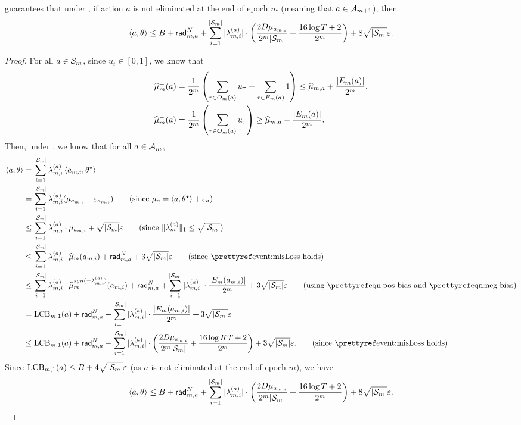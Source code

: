 \begin{lemma}\label{lem:epoch_B_with_mis}
     guarantees that under , if action $a$ is not eliminated at the end of epoch $m$ (meaning that $a\in {\mathcal{A}}_{m+1}$), then
    \begin{align*}
    \left\langle {a,\theta} \right\rangle\leq B +\mathsf{rad}_{m,a}^{N}+ \sum_{i=1}^{|{\mathcal{S}}_m|}|\lambda_{m,i}^{(a)}|\cdot\left(\frac{2D\mu_{a_{m,i}}}{2^m|{\mathcal{S}}_m|}+\frac{16\log T +2}{2^m}\right) + 8\sqrt{|{\mathcal{S}}_m|}\varepsilon.
\end{align*}
\end{lemma}
\begin{proof}
For all $a\in {\mathcal{S}}_m$, since $u_{t}\in[0,1]$, we know that
\begin{align}
    \widehat{\mu}_{m}^+(a) &=\frac{1}{2^m}\left(\sum_{\tau\in O_m(a)}u_{\tau} + \sum_{\tau\in E_m(a)}1\right) \leq \widehat{\mu}_{m,a} + \frac{|E_m(a)|}{2^m}, \label{eqn:pos-bias}\\
    \widehat{\mu}_{m}^-(a) &=\frac{1}{2^m}\left(\sum_{\tau\in O_m(a)}u_{\tau} \right) \geq \widehat{\mu}_{m,a} - \frac{|E_m(a)|}{2^m} \label{eqn:neg-bias}.
\end{align}
Then, under , we know that for all $a\in {\mathcal{A}}_m$,
\begin{align*}
    \inner{a,\theta} &= \sum_{i=1}^{|\calS_m|}\lambda_{m,i}^{(a)}\inner{a_{m,i},\theta^\star}\\
    &= \sum_{i=1}^{|\calS_m|}\lambda_{m,i}^{(a)}(\mu_{a_{m,i}}-\epsilon_{a_{m,i}}) \tag{since $\mu_a = \inner{a,\theta^\star}+\epsilon_a$}\\
    &\leq \sum_{i=1}^{|\calS_m|}\lambda_{m,i}^{(a)}\cdot \mu_{a_{m,i}} + \sqrt{|\calS_m|}\epsilon \tag{since $\|\lambda_{m}^{(a)}\|_1\leq \sqrt{|\calS_m|}$} \\
    &\leq \sum_{i=1}^{|\calS_m|}\lambda_{m,i}^{(a)}\cdot \hat{\mu}_{m}(a_{m,i}) + \rad_{m,a}^{N} + 3\sqrt{|\calS_m|}\epsilon \tag{since \pref{event:misLoss} holds}\\
    &\leq \sum_{i=1}^{|\calS_m|}\lambda_{m,i}^{(a)}\cdot\hat{\mu}_{m}^{sgn(-\lambda_{m,i}^{(a)})}(a_{m,i}) + \rad_{m,a}^{N}+\sum_{i=1}^{|\calS_m|}|\lambda_{m,i}^{(a)}|\cdot \frac{|\unobs_m(a_{m,i})|}{2^m} + 3\sqrt{|\calS_m|}\epsilon \tag{using \pref{eqn:pos-bias} and \pref{eqn:neg-bias}}\\
    &= \LCB_{m,1}(a) + \rad_{m,a}^{N}+\sum_{i=1}^{|\calS_m|}|\lambda_{m,i}^{(a)}|\cdot \frac{|\unobs_m(a_{m,i})|}{2^m} + 3\sqrt{|\calS_m|}\epsilon\\
    &\leq \LCB_{m,1}(a) +\rad_{m,a}^{N}+ \sum_{i=1}^{|\calS_m|}|\lambda_{m,i}^{(a)}|\cdot\left(\frac{2D\mu_{a_{m,i}}}{2^m|\calS_m|}+\frac{16\log KT +2}{2^m}\right) + 3\sqrt{|\calS_m|}\epsilon. \tag{since \pref{event:misLoss} holds}
\end{align*}
Since ${\operatorname{LCB}}_{m,1}(a)\leq B+4\sqrt{|{\mathcal{S}}_m|}\varepsilon$ (as $a$ is not eliminated at the end of epoch $m$), we have
\begin{align*}
    \left\langle {a,\theta} \right\rangle\leq B +\mathsf{rad}_{m,a}^{N}+ \sum_{i=1}^{|{\mathcal{S}}_m|}|\lambda_{m,i}^{(a)}|\cdot\left(\frac{2D\mu_{a_{m,i}}}{2^m|{\mathcal{S}}_m|}+\frac{16\log T +2}{2^m}\right) + 8\sqrt{|{\mathcal{S}}_m|}\varepsilon.
\end{align*}
\end{proof}

